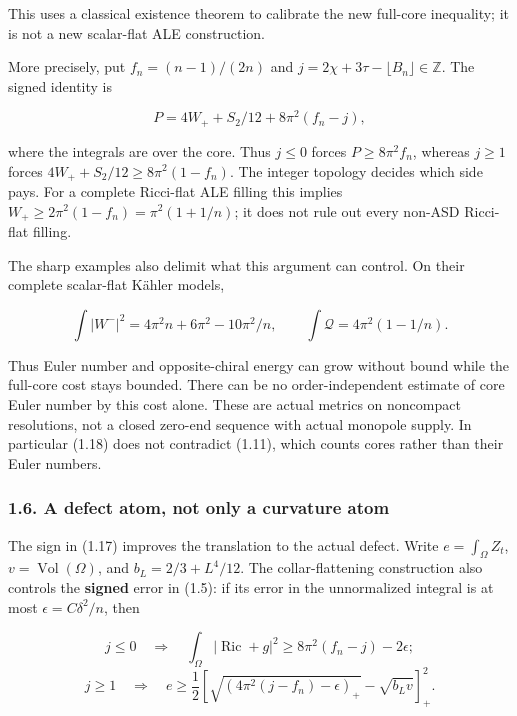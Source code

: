 \documentclass[
  10pt,
]{article}
\begin{document}
This uses a classical existence theorem to calibrate the new full-core
inequality; it is not a new scalar-flat ALE construction.

More precisely, put \(f_n=(n-1)/(2n)\) and
\(j=2\chi+3\tau-\lfloor B_n\rfloor\in\mathbb Z\). The signed identity is

\[
 P=4W_++S_2/12+8\pi^2(f_n-j),                       \tag{1.17}
\]

where the integrals are over the core. Thus \(j\le0\) forces
\(P\ge8\pi^2f_n\), whereas \(j\ge1\) forces
\(4W_++S_2/12\ge8\pi^2(1-f_n)\). The integer topology decides which side
pays. For a complete Ricci-flat ALE filling this implies
\(W_+\ge2\pi^2(1-f_n)=\pi^2(1+1/n)\); it does not rule out every non-ASD
Ricci-flat filling.

The sharp examples also delimit what this argument can control. On their
complete scalar-flat Kähler models,

\[
 \int|W^-|^2=4\pi^2n+6\pi^2-10\pi^2/n,
 \qquad \int\mathscr Q=4\pi^2(1-1/n).
                                                        \tag{1.18}
\]

Thus Euler number and opposite-chiral energy can grow without bound
while the full-core cost stays bounded. There can be no
order-independent estimate of core Euler number by this cost alone.
These are actual metrics on noncompact resolutions, not a closed
zero-end sequence with actual monopole supply. In particular (1.18) does
not contradict (1.11), which counts cores rather than their Euler
numbers.

\hypertarget{a-defect-atom-not-only-a-curvature-atom}{%
\subsubsection{1.6. A defect atom, not only a curvature
atom}\label{a-defect-atom-not-only-a-curvature-atom}}

The sign in (1.17) improves the translation to the actual defect. Write
\(e=\int_\Omega Z_t\), \(v=\operatorname{Vol}(\Omega)\), and
\(b_L=2/3+L^4/12\). The collar-flattening construction also controls the
\textbf{signed} error in (1.5): if its error in the unnormalized
integral is at most \(\epsilon=C\delta^2/n\), then

\[
 j\le0\quad\Longrightarrow\quad
 \int_\Omega|\operatorname{Ric}+g|^2
              \ge8\pi^2(f_n-j)-2\epsilon;                       \tag{1.19}
\] \[
 j\ge1\quad\Longrightarrow\quad
 e\ge\frac12\left[
       \sqrt{(4\pi^2(j-f_n)-\epsilon)_+}-\sqrt{b_Lv}
                         \right]_+^2.                          \tag{1.20}
\]
\end{document}

